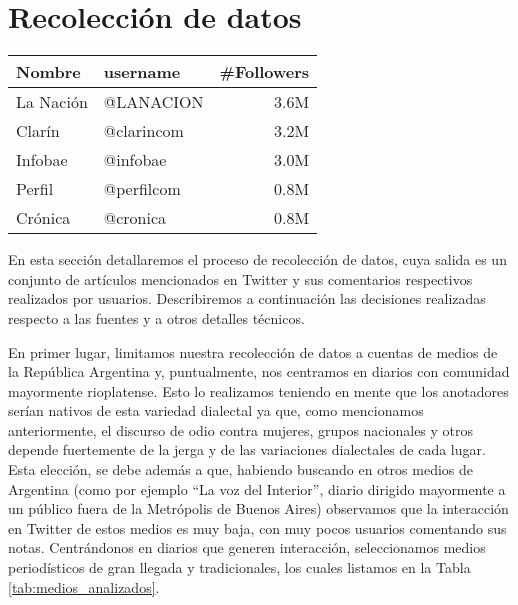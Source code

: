 

\section{Recolección de datos}

\begin{table*}[t]
    \centering
    \large
    \begin{tabular}{ l l r }
        Nombre     &  username          & \#Followers \\
        \hline
        La Nación  &  @LANACION         & 3.6M            \\
        Clarín     &  @clarincom        & 3.2M        \\
        Infobae    &  @infobae          & 3.0M   \\
        Perfil     &  @perfilcom        & 0.8M    \\
        Crónica    &  @cronica          & 0.8M     \\
        \hline
    \end{tabular}
    \caption{Cuentas de medios utilizadas para la recolección de datos, junto a sus nombres de usuarios y la cantidad de seguidores en Twitter (al momento de la recolección)}
    \label{tab:medios_analizados}
\end{table*}


En esta sección detallaremos el proceso de recolección de datos, cuya salida es un conjunto de artículos mencionados en Twitter y sus comentarios respectivos realizados por usuarios. Describiremos a continuación las decisiones realizadas respecto a las fuentes y a otros detalles técnicos.

En primer lugar, limitamos nuestra recolección de datos a cuentas de medios de la República Argentina y, puntualmente, nos centramos en diarios con comunidad mayormente rioplatense. Esto lo realizamos teniendo en mente que los anotadores serían nativos de esta variedad dialectal ya que, como mencionamos anteriormente, el discurso de odio contra mujeres, grupos nacionales y otros depende fuertemente de la jerga y de las variaciones dialectales de cada lugar. Esta elección, se debe además a que, habiendo buscando en otros medios de Argentina (como por ejemplo ``La voz del Interior'', diario dirigido mayormente a un público fuera de la Metrópolis de Buenos Aires) observamos que la interacción en Twitter de estos medios es muy baja, con muy pocos usuarios comentando sus notas. Centrándonos en diarios que generen interacción, seleccionamos medios periodísticos de gran llegada y tradicionales, los cuales listamos en la Tabla \ref{tab:medios_analizados}.

